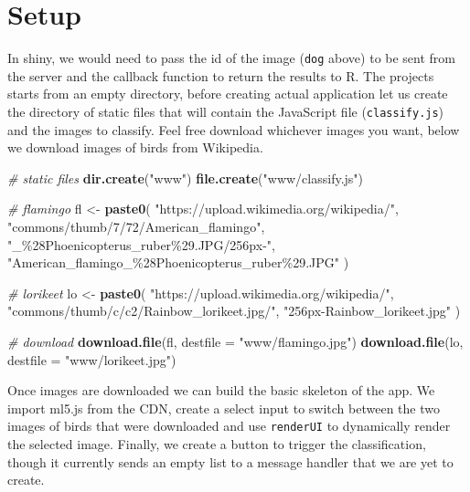 \documentclass[
]{krantz}
\makeatletter
\newenvironment{Shaded}{\begin{snugshade}}{\end{snugshade}}
\newcommand{\CommentTok}[1]{\textcolor[rgb]{0.37,0.37,0.37}{\textit{#1}}}
\newcommand{\DataTypeTok}[1]{\textcolor[rgb]{0.27,0.27,0.27}{#1}}
\newcommand{\KeywordTok}[1]{\textcolor[rgb]{0.27,0.27,0.27}{\textbf{#1}}}
\newcommand{\NormalTok}[1]{#1}
\newcommand{\StringTok}[1]{\textcolor[rgb]{0.5,0.5,0.5}{#1}}
\newenvironment{kframe}{%
\medskip{}
\setlength{\fboxsep}{.8em}
 \def\at@end@of@kframe{}%
 \ifinner\ifhmode%
  \def\at@end@of@kframe{\end{minipage}}%
  \begin{minipage}{\columnwidth}%
 \fi\fi%
 \def\FrameCommand##1{\hskip\@totalleftmargin \hskip-\fboxsep
 \colorbox{shadecolor}{##1}\hskip-\fboxsep
     \hskip-\linewidth \hskip-\@totalleftmargin \hskip\columnwidth}%
 \MakeFramed {\advance\hsize-\width
   \@totalleftmargin\z@ \linewidth\hsize
   \@setminipage}}%
 {\par\unskip\endMakeFramed%
 \at@end@of@kframe}
\renewenvironment{Shaded}{\begin{kframe}}{\end{kframe}}
\makeatother
\begin{document}
\hypertarget{v8-img-setup}{%
\section{Setup}\label{v8-img-setup}}

In shiny, we would need to pass the id of the image (\texttt{dog} above) to be sent from the server and the callback function to return the results to R. The projects starts from an empty directory, before creating actual application let us create the directory of static files that will contain the JavaScript file (\texttt{classify.js}) and the images to classify. Feel free download whichever images you want, below we download images of birds from Wikipedia.

\begin{Shaded}
\begin{Highlighting}[]
\CommentTok{\# static files}
\KeywordTok{dir.create}\NormalTok{(}\StringTok{"www"}\NormalTok{)}
\KeywordTok{file.create}\NormalTok{(}\StringTok{"www/classify.js"}\NormalTok{)}

\CommentTok{\# flamingo}
\NormalTok{fl \textless{}{-}}\StringTok{ }\KeywordTok{paste0}\NormalTok{(}
  \StringTok{"https://upload.wikimedia.org/wikipedia/"}\NormalTok{,}
  \StringTok{"commons/thumb/7/72/American\_flamingo"}\NormalTok{,}
  \StringTok{"\_\%28Phoenicopterus\_ruber\%29.JPG/256px{-}"}\NormalTok{,}
  \StringTok{"American\_flamingo\_\%28Phoenicopterus\_ruber\%29.JPG"}
\NormalTok{)}

\CommentTok{\# lorikeet}
\NormalTok{lo \textless{}{-}}\StringTok{ }\KeywordTok{paste0}\NormalTok{(}
  \StringTok{"https://upload.wikimedia.org/wikipedia/"}\NormalTok{,}
  \StringTok{"commons/thumb/c/c2/Rainbow\_lorikeet.jpg/"}\NormalTok{,}
  \StringTok{"256px{-}Rainbow\_lorikeet.jpg"}
\NormalTok{)}

\CommentTok{\# download}
\KeywordTok{download.file}\NormalTok{(fl, }\DataTypeTok{destfile =} \StringTok{"www/flamingo.jpg"}\NormalTok{)}
\KeywordTok{download.file}\NormalTok{(lo, }\DataTypeTok{destfile =} \StringTok{"www/lorikeet.jpg"}\NormalTok{)}
\end{Highlighting}
\end{Shaded}

Once images are downloaded we can build the basic skeleton of the app. We import ml5.js from the CDN, create a select input to switch between the two images of birds that were downloaded and use \texttt{renderUI} to dynamically render the selected image. Finally, we create a button to trigger the classification, though it currently sends an empty list to a message handler that we are yet to create.
\end{document}
